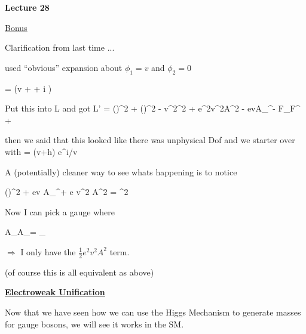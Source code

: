 
\usepackage{braket}
\usepackage{bbm}
\usepackage{relsize}
\usepackage{tcolorbox}




\usepackage{fancyhdr}

\fancyhf{}


\thispagestyle{fancy}

\begin{center}
{\huge \textbf{Lecture 28}}
\end{center}

{\fontsize{14}{16}\selectfont

\underline{\underline{Bonus}}  

Clarification from last time ... 

used ``obvious'' expansion about $\phi_1 = v$ and $\phi_2 = 0$

\be
\phi = (v + \eta + i \epsilon)
\ee

Put this into L and got 
\be
L' = (\partial \epsilon)^2 + (\partial \eta)^2 - v^2\lambda\eta^2 + e^2v^2A^2 - evA_\mu\partial^\mu\epsilon - F_{\mu\nu}F^{\mu\nu} + 
\ee

then we said that this looked like there was unphysical Dof and we starter over with 
\be
\phi = (v+h) e^{i\theta/v}
\ee

A (potentially) cleaner way to see whats happening is to notice 

\be
{} (\partial \epsilon)^2 + ev A_\mu \partial^\mu \epsilon + e v^2 A^2 = ^2
\ee

Now I can pick a gauge where 

\be
A_\mu \rightarrow A_\mu =  \partial_\mu \epsilon
\ee

$\Rightarrow$ I only have the $\frac{1}{2}e^2v^2A^2$ term.

(of course this is all equivalent as above)

\clearpage

\textbf{\underline{\underline{Electroweak Unification}}}

Now that we have seen how we can use the Higgs Mechanism to generate masses for gauge bosons, we will see it works in the SM.

}
